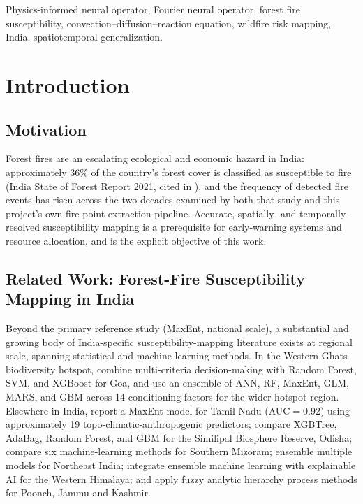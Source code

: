 \documentclass[journal]{IEEEtran}
\begin{document}
\begin{IEEEkeywords}
Physics-informed neural operator, Fourier neural operator, forest fire susceptibility, convection--diffusion--reaction equation, wildfire risk mapping, India, spatiotemporal generalization.
\end{IEEEkeywords}

\section{Introduction}
\label{sec:intro}

\subsection{Motivation}

Forest fires are an escalating ecological and economic hazard in India: approximately 36\% of the country's forest cover is classified as susceptible to fire (India State of Forest Report 2021, cited in \cite{biswas2025}), and the frequency of detected fire events has risen across the two decades examined by both that study and this project's own fire-point extraction pipeline. Accurate, spatially- and temporally-resolved susceptibility mapping is a prerequisite for early-warning systems and resource allocation, and is the explicit objective of this work.

\subsection{Related Work: Forest-Fire Susceptibility Mapping in India}

Beyond the primary reference study \cite{biswas2025} (MaxEnt, national scale), a substantial and growing body of India-specific susceptibility-mapping literature exists at regional scale, spanning statistical and machine-learning methods. In the Western Ghats biodiversity hotspot, \cite{uthappa2025} combine multi-criteria decision-making with Random Forest, SVM, and XGBoost for Goa, and \cite{kandanaveenbabu2023} use an ensemble of ANN, RF, MaxEnt, GLM, MARS, and GBM across 14 conditioning factors for the wider hotspot region. Elsewhere in India, \cite{meraj2025} report a MaxEnt model for Tamil Nadu (AUC$=$0.92) using approximately 19 topo-climatic-anthropogenic predictors; \cite{guria2025} compare XGBTree, AdaBag, Random Forest, and GBM for the Similipal Biosphere Reserve, Odisha; \cite{gupta2025} compare six machine-learning methods for Southern Mizoram; \cite{sarkar2024} ensemble multiple models for Northeast India; \cite{hang2024} integrate ensemble machine learning with explainable AI for the Western Himalaya; and \cite{malik2025} apply fuzzy analytic hierarchy process methods for Poonch, Jammu and Kashmir.
\end{document}
